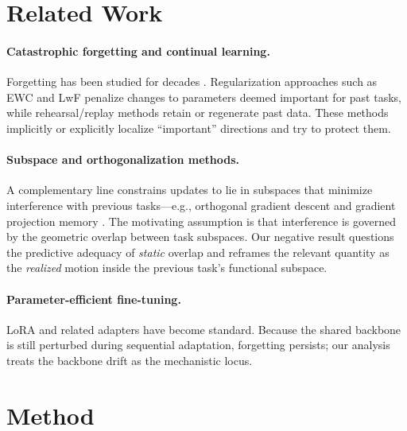 \documentclass[11pt]{article}
\begin{document}
\section{Related Work}
\label{sec:related}

\paragraph{Catastrophic forgetting and continual learning.}
Forgetting has been studied for decades \citep{mccloskey1989catastrophic,
french1999catastrophic}. Regularization approaches such as EWC
\citep{kirkpatrick2017overcoming} and LwF \citep{li2017learning} penalize
changes to parameters deemed important for past tasks, while rehearsal/replay
methods \citep{rebuffi2017icarl} retain or regenerate past data. These methods
implicitly or explicitly localize ``important'' directions and try to protect
them.

\paragraph{Subspace and orthogonalization methods.}
A complementary line constrains updates to lie in subspaces that minimize
interference with previous tasks---e.g., orthogonal gradient descent and
gradient projection memory \citep{farajtabar2020orthogonal,saha2021gradient}.
The motivating assumption is that interference is governed by the geometric
overlap between task subspaces. Our negative result questions the predictive
adequacy of \emph{static} overlap and reframes the relevant quantity as the
\emph{realized} motion inside the previous task's functional subspace.

\paragraph{Parameter-efficient fine-tuning.}
LoRA \citep{hu2021lora} and related adapters have become standard. Because the
shared backbone is still perturbed during sequential adaptation, forgetting
persists; our analysis treats the backbone drift as the mechanistic locus.

\section{Method}
\label{sec:method}
\end{document}
